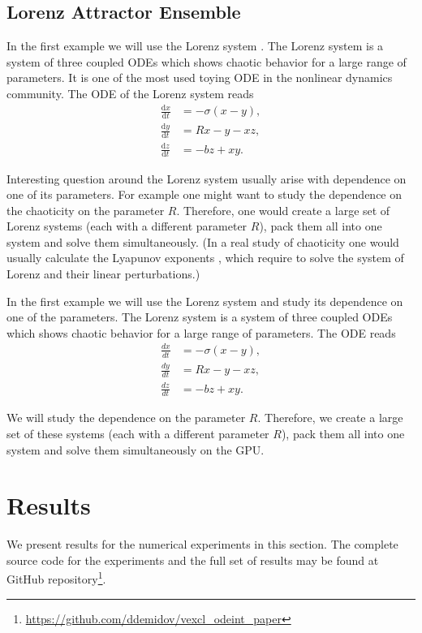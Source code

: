 \documentclass[1p]{elsarticle}
\newcommand {\de} {\mbox{d}}
\begin{document}
%
%
\subsection{Lorenz Attractor Ensemble}

In the first example we will use the Lorenz system \cite{Lorenz}. The
Lorenz system is a system of three coupled ODEs which shows chaotic
behavior for a large range of parameters. It is one of the most used
toying ODE in the nonlinear dynamics community. The ODE of the Lorenz
system reads
\begin{align}
    \frac{\de x}{\de t} &= -\sigma \left( x - y \right), \\
    \frac{\de y}{\de t} &= R x - y - xz, \\
    \frac{\de z}{\de t} &= -bz + xy.
\end{align}

Interesting question around the Lorenz system usually arise with
dependence on one of its parameters. For example one might want to
study the dependence on the chaoticity on the parameter
$R$. Therefore, one would create a large set of Lorenz systems (each
with a different parameter $R$), pack them all into one system and
solve them simultaneously. (In a real study of chaoticity one would
usually calculate the Lyapunov exponents \cite{Benettin}, which
require to solve the system of Lorenz and their linear perturbations.)


In the first example we will use the Lorenz system and study its dependence on
one of the parameters. The Lorenz system is a system of three coupled ODEs
which shows chaotic behavior for a large range of parameters. The ODE reads
\begin{align}
    \frac{dx}{dt} &= -\sigma \left( x - y \right), \\
    \frac{dy}{dt} &= R x - y - xz, \\
    \frac{dz}{dt} &= -bz + xy.
\end{align}

We will study the dependence on the parameter $R$. Therefore, we create a large
set of these systems (each with a different parameter $R$), pack them all into
one system and solve them simultaneously on the GPU.

\section{Results}

We present results for the numerical experiments in this section. The complete
source code for the experiments and the full set of results may be found at
GitHub
repository\footnote{\href{https://github.com/ddemidov/vexcl_odeint_paper}{https://github.com/ddemidov/vexcl\_odeint\_paper}}.
\end{document}
